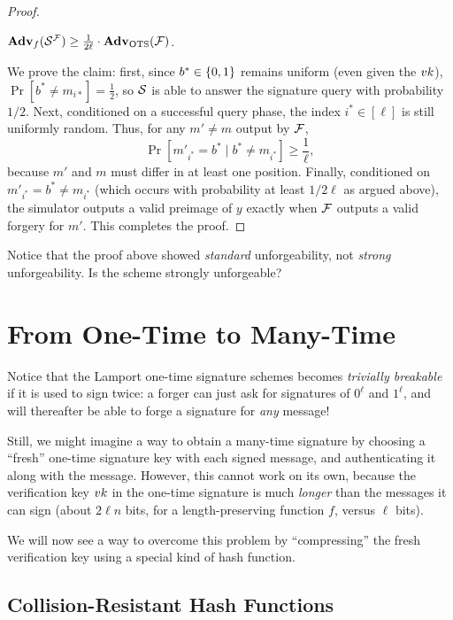 \documentclass[11pt]{article}
\begin{document}
\begin{proof}
  \begin{claim}
    $\mathbf{Adv}_{f}(\mathcal{S}^{\mathcal{F}}) \geq \frac{1}{2\ell} \cdot
    \mathbf{Adv}_{\text{OTS}}(\mathcal{F})$.
  \end{claim}

  We prove the claim: first, since $b^* \in \{0,1\}$ remains uniform
  (even given the $vk$), $\Pr[b^* \neq m_{i*}] = \frac{1}{2}$, so
  $\mathcal{S}$ is able to answer the signature query with probability $1/2$.
  Next, conditioned on a successful query phase, the index $i^{*} \in
  [\ell]$ is still uniformly random.  Thus, for any $m' \neq m$ output
  by $\mathcal{F}$, \[ \Pr[m'_{i^*} = b^{*} \mid b^* \neq m_{i^{*}} ] \geq
  \frac{1}{\ell}, \] because $m'$ and $m$ must differ in at least one
  position.  Finally, conditioned on $m'_{i^{*}} = b^{*} \neq
  m_{i^{*}}$ (which occurs with probability at least $1/2\ell$ as
  argued above), the simulator outputs a valid preimage of $y$ exactly
  when $\mathcal{F}$ outputs a valid forgery for $m'$.  This completes the
  proof.
\end{proof}

\begin{remark}
  Notice that the proof above showed \emph{standard} unforgeability,
  not \emph{strong} unforgeability.  Is the scheme strongly
  unforgeable?
\end{remark}

\section{From One-Time to Many-Time}
\label{sec:many-time-signatures}

Notice that the Lamport one-time signature schemes becomes
\emph{trivially breakable} if it is used to sign twice: a forger can
just ask for signatures of $0^{\ell}$ and $1^{\ell}$, and will
thereafter be able to forge a signature for \emph{any} message!

Still, we might imagine a way to obtain a many-time signature by
choosing a ``fresh'' one-time signature key with each signed message,
and authenticating it along with the message.  However, this cannot
work on its own, because the verification key $vk$ in the one-time
signature is much \emph{longer} than the messages it can sign (about
$2 \ell n$ bits, for a length-preserving function $f$, versus $\ell$
bits).

We will now see a way to overcome this problem by ``compressing'' the
fresh verification key using a special kind of hash function.

\subsection{Collision-Resistant Hash Functions}
\label{sec:coll-resist-hash}
\end{document}
